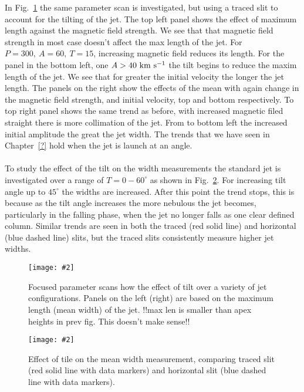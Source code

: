 \documentclass[12pt]{ociamthesis}
\newcommand{\mfig}[4]{
  \begin{figure}
  \begin{center}
  \texttt{[image: \#2]}
  \caption{#3}
  \label{#4}
  \end{center}
  \end{figure}}
\newcommand{\kms}{~\rm{km ~s^{-1}}}
\newcommand{\np}{\\ \\}
\begin{document}
In Fig.~\ref{p_scan_t_len} the same parameter scan is investigated, but using a traced slit to account for the tilting of the jet. The top left panel shows the effect of maximum length against the magnetic field strength. We see that that magnetic field strength in most case doesn’t affect the max length of the jet. For $P=300,~A=60,~T=15$, increasing magnetic field reduces its length. For the panel in the bottom left, one $A>40 \kms$  the tilt begins to reduce the maxim length of the jet. We see that for greater the initial velocity the longer the jet length. The panels on the right show the effects of the mean with again change in the magnetic field strength, and initial velocity, top and bottom respectively. To top right panel shows the same trend as before, with increased magnetic filed straight there is more collimation of the jet. From to bottom left the increased initial amplitude the great the jet width. The trends that we have seen in Chapter~\ref{?} hold when the jet is launch at an angle.  \np
%
To study the effect of the tilt on the width measurements the standard jet is investigated over a range of $T=0-60^{\circ}$ as shown in Fig.~\ref{width_measure}. For increasing tilt angle up to $45^{\circ}$ the widths are increased. After this point the trend stops, this is because as the tilt angle increases the more nebulous the jet becomes, particularly in the falling phase, when the jet no longer falls as one clear defined column. Similar trends are seen in both the traced (red solid line) and horizontal (blue dashed line) slits, but the traced slits consistently measure higher jet widths.  
\mfig{1}{figures/traced_slit_pscan.png}{Focused parameter scans how the effect of tilt over a variety of jet configurations. Panels on the left (right) are based on the maximum length (mean width) of the jet. {\color{green}!!max len is smaller than apex heights in prev fig. This doesn’t make sense!!}}{p_scan_t_len}
%
\mfig{1}{figures/mean_w_vs_tilt.png}{Effect of tile on the mean width measurement, comparing traced slit (red solid line with data markers) and horizontal slit (blue dashed line with data markers).}{width_measure}
\end{document}
